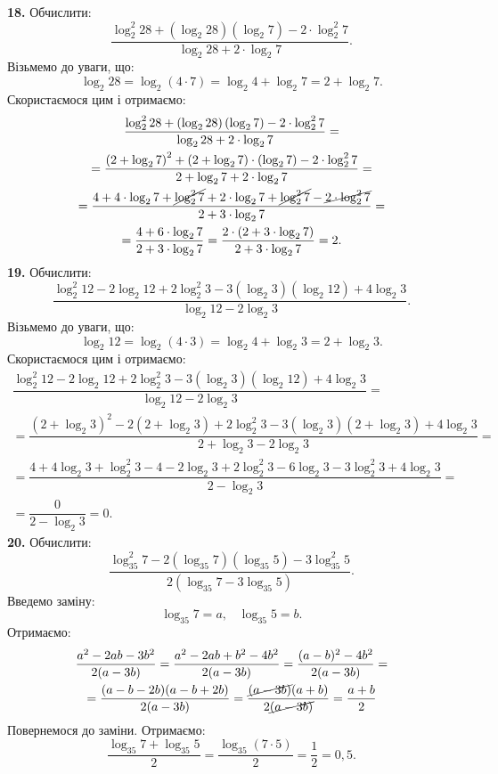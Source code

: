 \textbf{18.} Обчислити:
$$
\dfrac{\log^{2}_{2}28+\left(\log_{2}28\right)\left(\log_{2}7\right)-2\cdot\log^{2}_{2}7}{\log_{2}28+2\cdot\log_{2}7}.
$$
Візьмемо до уваги, що:
$$
\log_{2}28=
\log_{2}(4\cdot7)=
\log_{2}4+\log_{2}7=
2+\log_{2}7.
$$
Скористаємося цим і отримаємо:
\begin{multline*}
\dfrac{\log^{2}_{2}28+\left(\log_{2}28\right)\left(\log_{2}7\right)-2\cdot\log^{2}_{2}7}{\log_{2}28+2\cdot\log_{2}7}=\\
=\dfrac{\left(2+\log_{2}7\right)^2+\left(2+\log_{2}7\right)\cdot\left(\log_{2}7\right)-
2\cdot\log^{2}_{2}7}{2+\log_{2}7+2\cdot\log_{2}7}=\\
=\dfrac{4+4\cdot\log_{2}7+\cancel{\log^{2}_{2}7}+2\cdot\log_{2}7+\cancel{\log^{2}_{2}7}-
\cancel{2\cdot\log^{2}_{2}7}}{2+3\cdot\log_{2}7}=\\
=\dfrac{4+6\cdot\log_{2}7}{2+3\cdot\log_{2}7}=
\dfrac{2\cdot\left(2+3\cdot\log_{2}7\right)}{2+3\cdot\log_{2}7}=2.
\end{multline*}
\textbf{19.} Обчислити:
$$
\dfrac{\log^{2}_{2}12-2\log_{2}12+2\log^{2}_{2}3-3\left(\log_{2}3\right)\left(\log_{2}12\right)+
4\log_{2}3}{\log_{2}12-2\log_{2}3}.
$$
Візьмемо до уваги, що:
$$
\log_{2}12=
\log_{2}(4\cdot3)=
\log_{2}4+\log_{2}3=
2+\log_{2}3.
$$
Скористаємося цим і отримаємо:
\begin{multline*}
\dfrac{\log^{2}_{2}12-2\log_{2}12+2\log^{2}_{2}3-3\left(\log_{2}3\right)\left(\log_{2}12\right)+
4\log_{2}3}{\log_{2}12-2\log_{2}3}=\\
=\dfrac{\left(2+\log_{2}3\right)^2-2\left(2+\log_{2}3\right)+2\log^{2}_{2}3-
3\left(\log_{2}3\right)\left(2+\log_{2}3\right)+4\log_{2}3}{2+\log_{2}3-2\log_{2}3}=\\
=\dfrac{4+4\log_{2}3+\log^{2}_{2}3-4-2\log_{2}3+2\log^{2}_{2}3-6\log_{2}3-3\log^{2}_{2}3+
4\log_{2}3}{2-\log_{2}3}=\\
=\dfrac{0}{2-\log_{2}3}=0.
\end{multline*}
\textbf{20.} Обчислити:
$$
\dfrac{\log^{2}_{35}7-2\left(\log_{35}7\right)\left(\log_{35}5\right)-3\log^{2}_{35}5}{2\left(\log_{35}7-3\log_{35}5\right)}.
$$
Введемо заміну:
$$
\log_{35}7=a, \;\;\; \log_{35}5=b.
$$
Отримаємо:
\begin{multline*}
\dfrac{a^2-2ab-3b^2}{2(a-3b)}=
\dfrac{a^2-2ab+b^2-4b^2}{2(a-3b)}=
\dfrac{(a-b)^2-4b^2}{2(a-3b)}=\\
=\dfrac{(a-b-2b)(a-b+2b)}{2(a-3b)}=
\dfrac{\cancel{(a-3b)}(a+b)}{2\cancel{(a-3b)}}=
\dfrac{a+b}{2}
\end{multline*}
Повернемося до заміни. Отримаємо:
$$
\dfrac{\log_{35}7+\log_{35}5}{2}=
\dfrac{\log_{35}(7\cdot5)}{2}=
\dfrac{1}{2}=0,5.
$$
